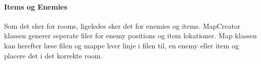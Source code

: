 \paragraph{Items og Enemies \\}
Som det sker for rooms, ligeledes sker det for enemies og items. MapCreator klassen
generer seperate filer for enemy positions og item lokationer. Map klassen 
kan herefter læse filen og mappe hver linje i filen til, en enemy eller item og 
placere det i det korrekte room.

